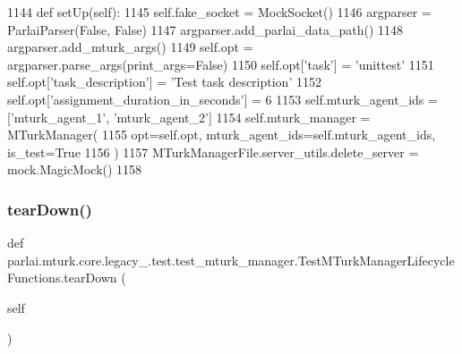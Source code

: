 \begin{DoxyCode}
1144     \textcolor{keyword}{def }setUp(self):
1145         self.fake\_socket = MockSocket()
1146         argparser = ParlaiParser(\textcolor{keyword}{False}, \textcolor{keyword}{False})
1147         argparser.add\_parlai\_data\_path()
1148         argparser.add\_mturk\_args()
1149         self.opt = argparser.parse\_args(print\_args=\textcolor{keyword}{False})
1150         self.opt[\textcolor{stringliteral}{'task'}] = \textcolor{stringliteral}{'unittest'}
1151         self.opt[\textcolor{stringliteral}{'task\_description'}] = \textcolor{stringliteral}{'Test task description'}
1152         self.opt[\textcolor{stringliteral}{'assignment\_duration\_in\_seconds'}] = 6
1153         self.mturk\_agent\_ids = [\textcolor{stringliteral}{'mturk\_agent\_1'}, \textcolor{stringliteral}{'mturk\_agent\_2'}]
1154         self.mturk\_manager = MTurkManager(
1155             opt=self.opt, mturk\_agent\_ids=self.mturk\_agent\_ids, is\_test=\textcolor{keyword}{True}
1156         )
1157         MTurkManagerFile.server\_utils.delete\_server = mock.MagicMock()
1158 
\end{DoxyCode}
\mbox{\label{classparlai_1_1mturk_1_1core_1_1legacy__2018_1_1test_1_1test__mturk__manager_1_1TestMTurkManagerLifecycleFunctions_a12fb26102e0071525ce6f91e9059c72c}} 
\subsubsection{\texorpdfstring{tear\+Down()}{tearDown()}}
{\footnotesize\ttfamily def parlai.\+mturk.\+core.\+legacy\+\_.\+test.\+test\+\_\+mturk\+\_\+manager.\+Test\+M\+Turk\+Manager\+Lifecycle\+Functions.\+tear\+Down (\begin{DoxyParamCaption}\item[{}]{self }\end{DoxyParamCaption})}



